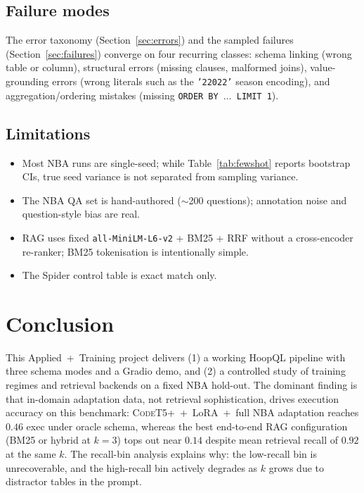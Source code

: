 \documentclass[11pt,a4paper]{article}
\newcommand{\codet}{\textsc{CodeT5+}}
\begin{document}
\subsection{Failure modes}
The error taxonomy (Section~\ref{sec:errors}) and the sampled failures
(Section~\ref{sec:failures}) converge on four recurring classes:
schema linking (wrong table or column), structural errors (missing clauses,
malformed joins), value-grounding errors (wrong literals such as the
\texttt{'22022'} season encoding), and aggregation/ordering mistakes
(missing \texttt{ORDER BY $\dots$ LIMIT 1}).

\subsection{Limitations}
\begin{itemize}[leftmargin=*,itemsep=2pt]
\item Most NBA runs are single-seed; while Table~\ref{tab:fewshot} reports
      bootstrap CIs, true seed variance is not separated from sampling
      variance.
\item The NBA QA set is hand-authored ($\sim$200 questions); annotation noise
      and question-style bias are real.
\item RAG uses fixed \texttt{all-MiniLM-L6-v2} + BM25 + RRF without a
      cross-encoder re-ranker; BM25 tokenisation is intentionally simple.
\item The Spider control table is exact match only.
\end{itemize}

\section{Conclusion}
\label{sec:conclusion}

This Applied~+~Training project delivers (1) a working HoopQL
pipeline with three schema modes and a Gradio demo, and (2) a controlled
study of training regimes and retrieval backends on a fixed NBA hold-out.
The dominant finding is that in-domain adaptation data, not retrieval
sophistication, drives execution accuracy on this benchmark:
\codet{}~+~LoRA~+~full NBA adaptation reaches $0.46$ exec under oracle
schema, whereas the best end-to-end RAG configuration (BM25 or hybrid at
$k{=}3$) tops out near $0.14$ despite mean retrieval recall of $0.92$ at the
same $k$. The recall-bin analysis explains why: the low-recall bin is
unrecoverable, and the high-recall bin actively degrades as $k$ grows due to
distractor tables in the prompt.
\end{document}
